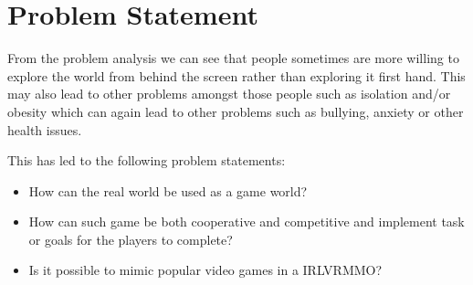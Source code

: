 \section{Problem Statement}

From the problem analysis we can see that people sometimes are more willing to explore the world from behind the screen rather than exploring it first hand. This may also lead to other problems amongst those people such as isolation and/or obesity which can again lead to other problems such as bullying, anxiety or other health issues.

This has led to the following problem statements:

\begin{itemize}
\item How can the real world be used as a game world?
\item How can such game be both cooperative and competitive and implement task or goals for the players to complete?
\item Is it possible to mimic popular video games in a IRLVRMMO?
\end{itemize}